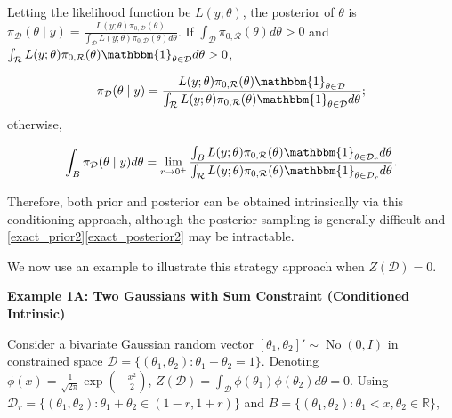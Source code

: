 \documentclass[10pt]{article}
\newcommand{\mc}[1]{\mathcal{#1}}
\DeclareMathOperator{\No}{No}
\DeclareMathOperator{\1}{\mathbbm{1}}
\begin{document}
Letting the likelihood function be $L(y;\theta)$, the posterior of $\theta$ is $\pi_{\mc D}(\theta \mid y)=\frac{ L(y;\theta) \pi_{0,\mc D}(\theta)}{{\int_\mc D}L(y;\theta) \pi_{0,\mc D}(\theta)d\theta}$. If $\int_{\mc D} \pi_{0,\mc R}(\theta)d\theta >0$ and $\int_{\mc R} L(y;\theta)\pi_{0,\mc R}(\theta) \mathbbm{1}_{\theta\in \mc D}d\theta >0$,

\begin{equation}
\label{exact_posterior1}
	{\pi}_{\mc D}(\theta \mid y) = \frac{ L(y;\theta)\pi_{0,\mc R}(\theta)\mathbbm{1}_{\theta\in \mc D} }{ \int_{\mc R} L(y;\theta)\pi_{0,\mc R}(\theta) \mathbbm{1}_{\theta\in \mc D}d\theta };
\end{equation}
otherwise,

\begin{equation}
\label{exact_posterior2}
	\int_{B} {\pi}_{\mc D}(\theta \mid y) d\theta = \lim_{r\rightarrow 0^+}  \frac{ \int_{B}  L(y;\theta)\pi_{0,\mc R}(\theta)\mathbbm{1}_{\theta\in \mc D_r}  d\theta }{ \int_{\mc R} L(y;\theta)\pi_{0,\mc R}(\theta) \mathbbm{1}_{\theta\in \mc D_r}d\theta }.
\end{equation}

Therefore, both prior and posterior can be obtained intrinsically via this conditioning approach, although the posterior sampling is generally difficult and \eqref{exact_prior2}\eqref{exact_posterior2} may be intractable.

We now use an example to illustrate this strategy approach when $Z(\mc D)=0$.

{\bf Example 1A: Two Gaussians with Sum Constraint (Conditioned Intrinsic)}

Consider a bivariate Gaussian random vector $[\theta_1,\theta_2]' \sim \No(0,I)$ in constrained space $\mc D=\{(\theta_1,\theta_2):\theta_1+\theta_2=1\}$. Denoting $\phi(x)= \frac{1}{\sqrt{2\pi}} \exp(-\frac{x^2}{2})$, $Z(\mc D)=\int_{\mc D} \phi(\theta_1)\phi(\theta_2)d\theta =0$. Using $\mc D_r=\{(\theta_1,\theta_2):\theta_1+\theta_2 \in (1-r, 1+r)\}$ and $B= \{(\theta_1,\theta_2): \theta_1< x, \theta_2\in \mathbb R\}$,
\end{document}
